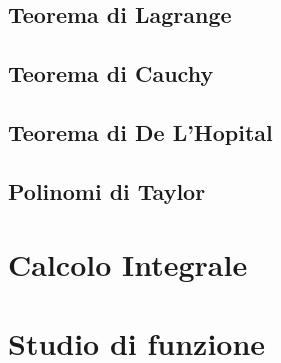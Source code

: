 \documentclass[a4paper]{article}
\begin{document}
\subsection{Teorema di Lagrange}
\subsection{Teorema di Cauchy}
\subsection{Teorema di De L'Hopital}

\subsection{Polinomi di Taylor}
\section{Calcolo Integrale}

\section{Studio di funzione}
\end{document}
